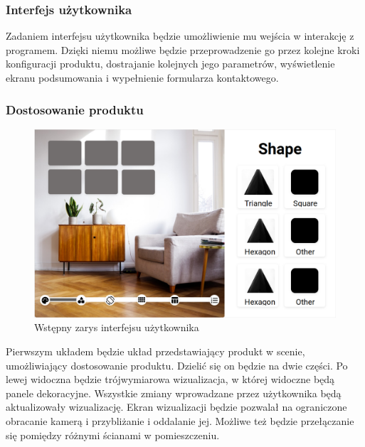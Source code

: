 \documentclass{article} %
\begin{document}
        \subsubsection{Interfejs użytkownika}
        Zadaniem interfejsu użytkownika będzie umożliwienie mu wejścia w interakcję z programem. Dzięki niemu możliwe będzie przeprowadzenie go przez kolejne kroki konfiguracji produktu, dostrajanie kolejnych jego parametrów, wyświetlenie ekranu podsumowania i wypełnienie formularza kontaktowego.
        \\
        
        
        \subsubsection*{Dostosowanie produktu}
        
        \begin{figure}[h]
        \centering
        \includegraphics[bb=0 0 1225 766,scale=0.3,keepaspectratio=true]{images/diagrams/ui_mockup.png}
        \caption{Wstępny zarys interfejsu użytkownika}
        \end{figure}

        

        Pierwszym układem będzie układ przedstawiający produkt w scenie, umożliwiający dostosowanie produktu. Dzielić się on będzie na dwie części. Po lewej widoczna będzie trójwymiarowa wizualizacja, w której widoczne będą panele dekoracyjne. Wszystkie zmiany wprowadzane przez użytkownika będą aktualizowały wizualizację. Ekran wizualizacji będzie pozwalał na ograniczone obracanie kamerą i przybliżanie i oddalanie jej. Możliwe też będzie przełączanie się pomiędzy różnymi ścianami w pomieszczeniu.
        \\
        
\end{document}
